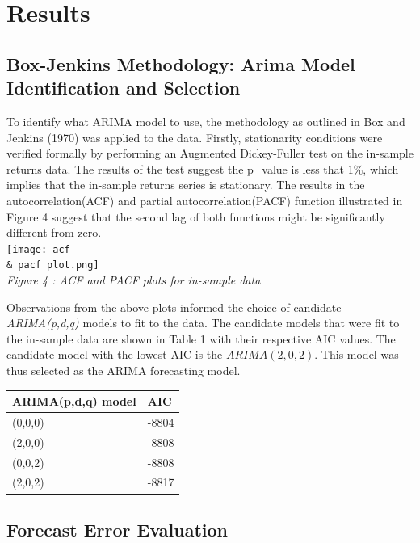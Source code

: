 \documentclass[12pt,a4paper]{article}
\numberwithin{equation}{section}
\numberwithin{figure}{section}
\numberwithin{table}{section}
\let\origtable\table
\let\endorigtable\endtable
\renewenvironment{table}[1][2] {
    \expandafter\origtable\expandafter[H]
} {
    \endorigtable
}
\begin{document}
\section{Results}\label{results}

\subsection{Box-Jenkins Methodology: Arima Model Identification and
Selection}\label{box-jenkins-methodology-arima-model-identification-and-selection}

To identify what ARIMA model to use, the methodology as outlined in Box
and Jenkins (1970) was applied to the data. Firstly, stationarity
conditions were verified formally by performing an Augmented
Dickey-Fuller test on the in-sample returns data. The results of the
test suggest the p\_value is less that 1\%, which implies that the
in-sample returns series is stationary. The results in the
autocorrelation(ACF) and partial autocorrelation(PACF) function
illustrated in Figure 4 suggest that the second lag of both functions
might be significantly different from zero.\\
\texttt{[image: acf \\\& pacf plot.png]}\\
\emph{Figure 4 : ACF and PACF plots for in-sample data}

Observations from the above plots informed the choice of candidate
\emph{ARIMA(p,d,q)} models to fit to the data. The candidate models that
were fit to the in-sample data are shown in Table 1 with their
respective AIC values. The candidate model with the lowest AIC is the
\(ARIMA(2,0,2)\). This model was thus selected as the ARIMA forecasting
model.

\begin{table}[H]
\centering
\begin{tabular}{ll}
  \hline
ARIMA(p,d,q) model & AIC \\ 
  \hline
(0,0,0) & -8804 \\ 
  (2,0,0) & -8808 \\ 
  (0,0,2) & -8808 \\ 
  (2,0,2) & -8817 \\ 
   \hline
\end{tabular}
\caption{AIC for Candidate ARIMA models} 
\end{table}

\subsection{Forecast Error Evaluation}\label{forecast-error-evaluation}
\end{document}
